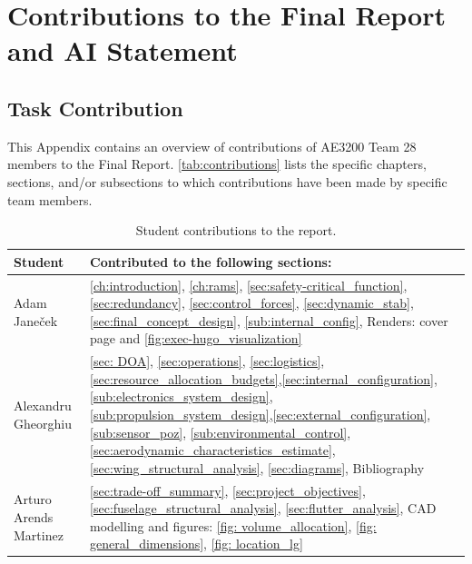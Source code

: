\chapter{Contributions to the Final Report and AI Statement}
\label{app: task distr}

\section{Task Contribution}
This Appendix contains an overview of contributions of AE3200 Team 28 members to the Final Report. \autoref{tab:contributions} lists the specific chapters, sections, and/or subsections to which contributions have been made by specific team members.

\begin{table}[H]
    \centering
    \small
    \setlength{\tabcolsep}{4pt}
    \renewcommand{\arraystretch}{1.2}
    \caption{Student contributions to the report.}
    \label{tab:contributions}

    \begin{tabularx}{\textwidth}{|>{\raggedright\arraybackslash}p{}|>{\raggedright\arraybackslash}X|}
        \hline 
        \textbf{Student} & \textbf{Contributed to the following sections:} \\
        \hline \hline 

        Adam Janeček & \autoref{ch:introduction}, \autoref{ch:rams}, \autoref{sec:safety-critical_function}, \autoref{sec:redundancy}, \autoref{sec:control_forces}, \autoref{sec:dynamic_stab}, \autoref{sec:final_concept_design}, \autoref{sub:internal_config}, Renders: cover page and \autoref{fig:exec-hugo_visualization}
        
        
        \\\hline 

        Alexandru Gheorghiu & \autoref{sec: DOA}, \autoref{sec:operations}, \autoref{sec:logistics}, \autoref{sec:resource_allocation_budgets},\autoref{sec:internal_configuration},\autoref{sub:electronics_system_design}, \autoref{sub:propulsion_system_design},\autoref{sec:external_configuration},\autoref{sub:sensor_poz}, \autoref{sub:environmental_control},\autoref{sec:aerodynamic_characteristics_estimate},\autoref{sec:wing_structural_analysis}, \autoref{sec:diagrams}, Bibliography
        
        
        \\\hline 

        Arturo Arends Martinez  & \autoref{sec:trade-off_summary}, \autoref{sec:project_objectives},\autoref{sec:fuselage_structural_analysis}, \autoref{sec:flutter_analysis}, CAD modelling and figures: \autoref{fig: volume_allocation}, \autoref{fig: general_dimensions}, \autoref{fig: location_lg}


\end{tabularx}
\end{table}
